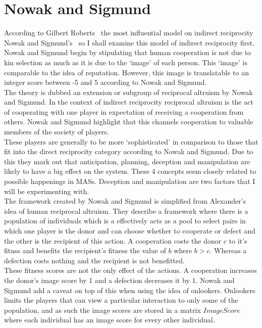 \documentclass[]{final_report}
\begin{document}
\section{Nowak and Sigmund}
According to Gilbert Roberts~\cite{evoldirindir} the most influential model on indirect reciprocity Nowak and Sigmund's~\cite{evol_indirect_image} so I shall examine this model of indirect reciprocity first. Nowak and Sigmund begin by stipulating that human cooperation is not due to kin selection as much as it is due to the `image' of each person. This `image' is comparable to the idea of reputation. However, this image is translatable to an integer score between -5 and 5 according to Nowak and Sigmund.\\
The theory is dubbed an extension or subgroup of reciprocal altruism by Nowak and Sigmund. In the context of indirect reciprocity reciprocal altruism is the act of cooperating with one player in expectation of receiving a cooperation from others. Nowak and Sigmund highlight that this channels cooperation to valuable members of the society of players.\\
These players are generally to be more `sophisticated' in comparison to those that fit into the direct reciprocity category according to Nowak and Sigmund. Due to this they mark out that anticipation, planning, deception and manipulation are likely to have a big effect on the system. These 4 concepts seem closely related to possible happenings in MASs. Deception and manipulation are two factors that I will be experimenting with.\\
The framework created by Nowak and Sigmund is simplified from Alexander's~\cite{alexander1987biology} idea of human reciprocal altruism. They describe a framework where there is a population of individuals which is a effectively acts as a pool to select pairs in which one player is the donor and can choose whether to cooperate or defect and the other is the recipient of this action. A cooperation costs the donor $c$ to it's fitnss and benefits the recipient's fitness the value of $b$ where $b>c$. Whereas a defection costs nothing and the recipient is not benefitted.\\
These fitness scores are not the only effect of the actions. A cooperation increases the donor's image score by 1 and a defection decreases it by 1. Nowak and Sigmund add a caveat on top of this when using the idea of onlookers. Onlookers limits the players that can view a particular interaction to only some of the population, and as such the image scores are stored in a matrix $ImageScore$ where each individual has an image score for every other individual.\\
\end{document}
